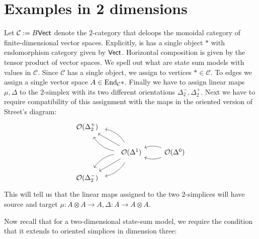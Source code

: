 \section{Examples in 2 dimensions} 

Let $\mathcal{C} := B\mathsf{Vect}$ denote the $2$-category that deloops the monoidal category of finite-dimensional vector spaces.
Explicitly, is has a single object $*$ with endomorphism category given by $\mathsf{Vect}$. 
Horizontal composition is given by the tensor product of vector spaces.
We spell out what are state sum models with values in $\mathcal{C}$.
Since $\mathcal{C}$ has a single object, we assign to vertices $* \in \mathcal{C}$.
To edges we assign a single vector space $A \in \mathrm{End}_\mathcal{C} *$.
Finally we have to assign linear maps $\mu, \Delta$ to the $2$-simplex with its two different orientations $\Delta^-_2, \Delta^+_2$.
Next we have to require compatibility of this assignment with the maps in the oriented version of Street's diagram:
\[
\begin{tikzcd}
\mathcal{O}(\Delta^+_2)    & &
\\
& \mathcal{O}(\Delta^1) \ar[lu, bend right = 25, shorten <=0.2cm, shorten >=0.2cm] \ar[lu, bend left = 25, shorten <=0.2cm, shorten >=0.2cm] \ar[lu] \ar[ld, bend right = 25, shorten <=0.2cm, shorten >=0.2cm] \ar[ld, bend left = 25, shorten <=0.2cm, shorten >=0.2cm] \ar[ld] & \mathcal{O}(\Delta^0) \ar[l, bend left=20] \ar[l, bend right=20]
\\
\mathcal{O}(\Delta^-_2) & &
\end{tikzcd}
\]
This will tell us that the linear maps assigned to the two $2$-simplices will have source and target $\mu: A \otimes A \to A, \Delta: A \to A \otimes A$.

Now recall that for a two-dimensional state-sum model, we require the condition that it extends to oriented simplices in dimension three:

